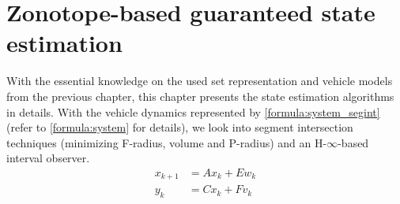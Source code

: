 \chapter{Zonotope-based guaranteed state estimation} \label{ch:state_estimation}
With the essential knowledge on the used set representation and vehicle models from the previous chapter, this chapter presents the state estimation algorithms in details. With the vehicle dynamics represented by \eqref{formula:system_segint} (refer to \eqref{formula:system} for details), we look into segment intersection techniques (minimizing F-radius, volume and P-radius) and an H-$\infty$-based interval observer.
\begin{equation}
\label{formula:system_segint}
\begin{split}
x_{k+1} &= Ax_k + Ew_k\\
y_k &= Cx_k + Fv_k
\end{split}
\end{equation}
